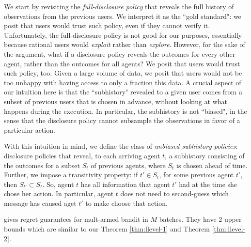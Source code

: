 We start by revisiting the \emph{full-disclosure policy} that reveals the full history of observations from the previous users. We interpret it as the ``gold standard": we posit that users would trust such policy, even if they cannot verify it. Unfortunately, the full-disclosure policy is not good for our purposes, essentially because rational users would \emph{exploit} rather than \emph{explore}. However, for the sake of the argument, what if a disclosure policy reveals the outcomes for every other agent, rather than the outcomes for all agents? We posit that users would trust such policy, too. Given a large volume of data, we posit that users would not be too unhappy with having access to only a fraction this data. A crucial aspect of our intuition here is that the ``subhistory" revealed to a given user comes from a subset of previous users that is chosen in advance, without looking at what happens during the execution. In particular, the subhistory is not ``biased", in the sense that the disclosure policy cannot subsample the observations in favor of a particular action.

With this intuition in mind, we define the class of \emph{unbiased-subhistory policies}: disclosure policies that reveal, to each arriving agent $t$, a subhistory  consisting of the outcomes for a subset $S_t$ of previous agents, where $S_t$ is chosen ahead of time. Further, we impose a transitivity property: if $t' \in S_t$, for some previous agent $t'$, then $S_{t'}\subset S_t$. So, agent $t$ has all information that agent $t'$ had at the time she chose her action. In particular, agent $t$ does not need to second-guess which message has caused aget $t'$ to make choose that action.













\cite{Perchet2015BatchedBP} gives regret guarantees for mult-armed bandit in $M$ batches. They have 2 upper bounds which are similar to our Theorem \ref{thm:llevel-1} and Theorem \ref{thm:llevel-2}.
